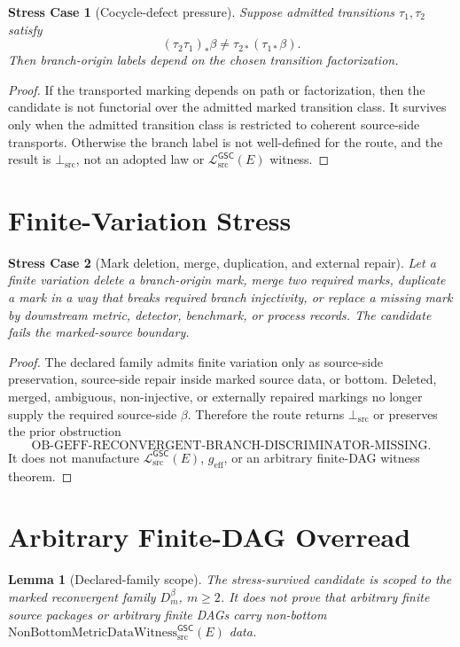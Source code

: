 \documentclass[11pt]{article}
\newcommand{\Witness}{\mathrm{NonBottomMetricDataWitness}_{\mathrm{src}}^{\mathsf{GSC}}}
\newcommand{\MetricData}{\mathcal{L}_{\mathrm{src}}^{\mathsf{GSC}}}
\newcommand{\BottomSrc}{\bot_{\mathrm{src}}}
\newcommand{\geff}{g_{\mathrm{eff}}}
\newcommand{\Dmbeta}{D_m^{\beta}}
\newtheorem{lemma}{Lemma}
\newtheorem{stresscase}{Stress Case}
\begin{document}
\begin{stresscase}[Cocycle-defect pressure]
Suppose admitted transitions \(\tau_1,\tau_2\) satisfy
\[
  (\tau_2\tau_1)_\ast\beta\ne \tau_{2\ast}(\tau_{1\ast}\beta).
\]
Then branch-origin labels depend on the chosen transition factorization.
\end{stresscase}

\begin{proof}
If the transported marking depends on path or factorization, then the
candidate is not functorial over the admitted marked transition class. It
survives only when the admitted transition class is restricted to coherent
source-side transports. Otherwise the branch label is not well-defined for
the route, and the result is \(\BottomSrc\), not an adopted law or
\(\MetricData(E)\) witness.
\end{proof}

\section{Finite-Variation Stress}

\begin{stresscase}[Mark deletion, merge, duplication, and external repair]
Let a finite variation delete a branch-origin mark, merge two required marks,
duplicate a mark in a way that breaks required branch injectivity, or replace
a missing mark by downstream metric, detector, benchmark, or process records.
The candidate fails the marked-source boundary.
\end{stresscase}

\begin{proof}
The declared family admits finite variation only as source-side preservation,
source-side repair inside marked source data, or bottom. Deleted, merged,
ambiguous, non-injective, or externally repaired markings no longer supply the
required source-side \(\beta\). Therefore the route returns \(\BottomSrc\) or
preserves the prior obstruction
\[
\mathrm{OB\mbox{-}GEFF\mbox{-}RECONVERGENT\mbox{-}BRANCH\mbox{-}DISCRIMINATOR\mbox{-}MISSING}.
\]
It does not manufacture \(\MetricData(E)\), \(\geff\), or an arbitrary
finite-DAG witness theorem.
\end{proof}

\section{Arbitrary Finite-DAG Overread}

\begin{lemma}[Declared-family scope]
The stress-survived candidate is scoped to the marked reconvergent family
\(\Dmbeta\), \(m\ge2\). It does not prove that arbitrary finite source
packages or arbitrary finite DAGs carry non-bottom
\(\Witness(E)\) data.
\end{lemma}
\end{document}
